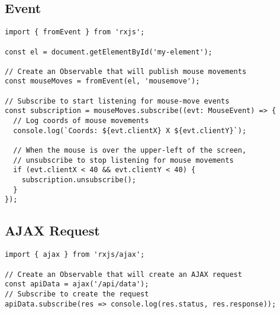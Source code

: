 \subsection{Event}

\begin{lstlisting}
import { fromEvent } from 'rxjs';

const el = document.getElementById('my-element');

// Create an Observable that will publish mouse movements
const mouseMoves = fromEvent(el, 'mousemove');

// Subscribe to start listening for mouse-move events
const subscription = mouseMoves.subscribe((evt: MouseEvent) => {
  // Log coords of mouse movements
  console.log(`Coords: ${evt.clientX} X ${evt.clientY}`);

  // When the mouse is over the upper-left of the screen,
  // unsubscribe to stop listening for mouse movements
  if (evt.clientX < 40 && evt.clientY < 40) {
    subscription.unsubscribe();
  }
});
\end{lstlisting}

\subsection{AJAX Request}
\begin{lstlisting}
import { ajax } from 'rxjs/ajax';

// Create an Observable that will create an AJAX request
const apiData = ajax('/api/data');
// Subscribe to create the request
apiData.subscribe(res => console.log(res.status, res.response));
\end{lstlisting}